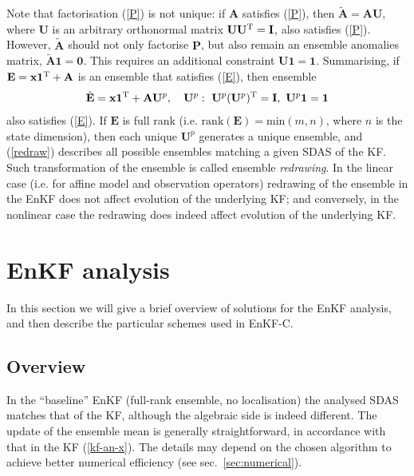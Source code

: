 \documentclass[11pt]{report}
\newcommand{\mb} {\mathbf}
\newcommand{\T}{^{\tiny \mathrm T}}
\begin{document}
Note that factorisation (\ref{P}) is not unique: if $\mb A$ satisfies (\ref{P}), then $\tilde {\mb A} = \mb A \mb U$, where $\mb U$ is an arbitrary orthonormal matrix $\mb U \mb U\T = \mb I$, also satisfies (\ref{P}).
However, $\tilde{\mb A}$ should not only factorise $\mb P$, but also remain an ensemble anomalies matrix, $\tilde{\mb A} \mb 1 = \mb 0$.
This requires an additional constraint $\mb U \mb 1 = \mb 1$.
Summarising, if $\mb E = \mb x \mb 1\T + \mb A$ is an ensemble that satisfies (\ref{E}), then ensemble
\begin{align}
  \label{redraw}
  \tilde{\mb E} = \mb x \mb 1\T + \mb A \mb U^p, \quad \mb U^p:\ \mb U^p (\mb U^p)\T = \mb I,\ \mb U^p \mb 1 = \mb 1
\end{align}
also satisfies (\ref{E}). 
If $\mb E$ is full rank (i.e. $\mathrm{rank}(\mb E) = \mathrm{min}(m, n)$, where $n$ is the state dimension), then each unique $\mb U^p$ generates a unique ensemble, and (\ref{redraw}) describes all possible ensembles matching a given SDAS of the KF.
Such transformation of the ensemble is called ensemble \emph{redrawing}.
In the linear case (i.e. for affine model and observation operators) redrawing of the ensemble in the EnKF does not affect evolution of the underlying KF; and conversely, in the nonlinear case the redrawing does indeed affect evolution of the underlying KF.

\section{EnKF analysis}

In this section we will give a brief overview of solutions for the EnKF analysis, and then describe the particular schemes used in EnKF-C.

\subsection{Overview}

In the ``baseline'' EnKF (full-rank ensemble, no localisation) the analysed SDAS matches that of the KF, although the algebraic side is indeed different.
The update of the ensemble mean is generally straightforward, in accordance with that in the KF (\ref{kf-an-x}).
The details may depend on the chosen algorithm to achieve better numerical efficiency (see sec.~\ref{sec:numerical}).
\end{document}
